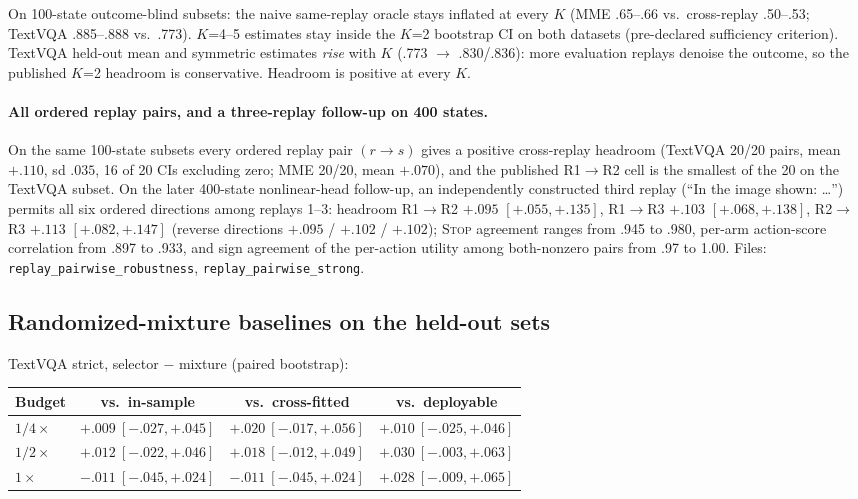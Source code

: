 \documentclass[10pt]{article}
\begin{document}
On 100-state outcome-blind subsets: the naive same-replay oracle stays
inflated at every $K$ (MME .65--.66 vs.\ cross-replay .50--.53; TextVQA
.885--.888 vs.\ .773). $K$=4--5 estimates stay inside the $K$=2 bootstrap
CI on both datasets (pre-declared sufficiency criterion). TextVQA held-out
mean and symmetric estimates \emph{rise} with $K$ (.773 $\to$ .830/.836):
more evaluation replays denoise the outcome, so the published $K$=2
headroom is conservative. Headroom is positive at every $K$.

\paragraph{All ordered replay pairs, and a three-replay follow-up on 400 states.}
On the same 100-state subsets every ordered replay pair $(r \to s)$ gives a
positive cross-replay headroom (TextVQA 20/20 pairs, mean $+.110$, sd
$.035$, 16 of 20 CIs excluding zero; MME 20/20, mean $+.070$), and the
published R1$\to$R2 cell is the smallest of the 20 on the TextVQA subset. On
the later 400-state nonlinear-head follow-up, an independently constructed
third replay (``In the image shown: \ldots'') permits all six ordered
directions among replays 1--3: headroom R1$\to$R2 $+.095$ $[+.055, +.135]$,
R1$\to$R3 $+.103$ $[+.068, +.138]$, R2$\to$R3 $+.113$ $[+.082, +.147]$
(reverse directions $+.095$ / $+.102$ / $+.102$); \textsc{Stop} agreement
ranges from .945 to .980, per-arm action-score correlation from .897 to
.933, and sign agreement of the per-action utility among both-nonzero pairs
from .97 to 1.00. Files: \texttt{replay\_pairwise\_robustness},
\texttt{replay\_pairwise\_strong}.

\subsection{Randomized-mixture baselines on the held-out sets}

TextVQA strict, selector $-$ mixture (paired bootstrap):

\begin{center}
\small
\begin{tabular}{lccc}
\toprule
Budget & vs.\ in-sample & vs.\ cross-fitted & vs.\ deployable \\
\midrule
$1/4\times$ & $+.009\ [-.027,+.045]$ & $+.020\ [-.017,+.056]$ & $+.010\ [-.025,+.046]$ \\
$1/2\times$ & $+.012\ [-.022,+.046]$ & $+.018\ [-.012,+.049]$ & $+.030\ [-.003,+.063]$ \\
$1\times$   & $-.011\ [-.045,+.024]$ & $-.011\ [-.045,+.024]$ & $+.028\ [-.009,+.065]$ \\
\bottomrule
\end{tabular}
\end{center}
\end{document}
